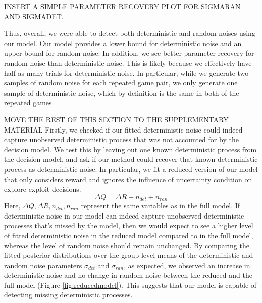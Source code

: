 \documentclass[12pt]{article}
\begin{document}
{	INSERT A SIMPLE PARAMETER RECOVERY PLOT FOR SIGMARAN AND SIGMADET.
	
	
	Thus, overall, we were able to detect both deterministic and random noises using our model. Our model provides a lower bound for deterministic noise and an upper bound for random noise. In addition, we see better parameter recovery for random noise than deterministic noise. This is likely because we effectively have half as many trials for deterministic noise. In particular, while we generate two samples of random noise for each repeated game pair, we only generate one sample of deterministic noise, which by definition is the same in both of the repeated games. 



MOVE THE REST OF THIS SECTION TO THE SUPPLEMENTARY MATERIAL
Firstly, we checked if our fitted deterministic noise could indeed capture unobserved deterministic process that was not accounted for by the decision model. We test this by leaving out one known deterministic process from the decision model, and ask if our method could recover that known deterministic process as deterministic noise. In particular, we fit a reduced version of our model that only considers reward and ignores the influence of uncertainty condition on explore-exploit decisions.  
$$\Delta Q= \Delta R+n_{det}+n_{ran}$$
Here, $\Delta Q, \Delta R, n_{det}, n_{ran}$ represent the same variables as in the full model.	If deterministic noise in our model can indeed capture unobserved deterministic processes that's missed by the model, then we would expect to see a higher level of fitted deterministic noise in the reduced model compared to in the full model, whereas the level of random noise should remain unchanged. By comparing the	fitted posterior distributions over the group-level means of the deterministic and random noise parameters $\sigma_{det}$ and $\sigma_{ran}$, as expected, we observed an increase in deterministic noise and no change in random noise between the reduced and the full model (Figure \ref{fig:reducedmodel}). This suggests that our model is capable of detecting missing deterministic processes.

}
\end{document}

